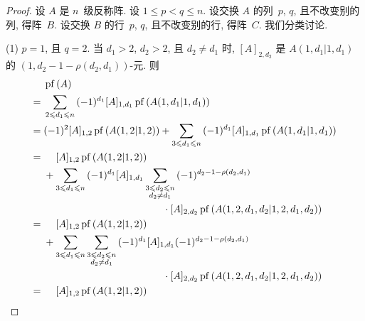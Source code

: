 \documentclass[../libro.tex]{subfiles}
\begin{document}
\begin{proof}
    设 \(A\) 是 \(n\)~级反称阵.
    设 \(1 \leq p < q \leq n\).
    设交换 \(A\) 的列~\(p\), \(q\), 且不改变别的列, 得阵~\(B\).
    设交换 \(B\) 的行~\(p\), \(q\), 且不改变别的行, 得阵~\(C\).
    我们分类讨论.

    (1)
    \(p = 1\), 且 \(q = 2\).
    当 \(d_1 > 2\), \(d_2 > 2\), 且 \(d_2 \neq d_1\) 时,
    \([A]_{2,d_2}\) 是 \(A({1,d_1}|{1,d_1})\)
    的 \((1, d_2 - 1 - \rho(d_2, d_1))\)-元.
    则
    \begin{align*}
        &
        \operatorname{pf} {(A)}
        \\
        = {} &
        \sum_{2 \leq d_1 \leq n}
        {
            (-1)^{d_1} [A]_{1,d_1}
            \operatorname{pf} {(A({1,d_1}|{1,d_1}))}
        }
        \\
        = {} &
        (-1)^{2} [A]_{1,2}
        \operatorname{pf} {(A({1,2}|{1,2}))}
        +
        \sum_{3 \leq d_1 \leq n}
        {
            (-1)^{d_1} [A]_{1,d_1}
            \operatorname{pf} {(A({1,d_1}|{1,d_1}))}
        }
        \\
        = {} &
        \hphantom{{} + {}}
        [A]_{1,2}
        \operatorname{pf} {(A({1,2}|{1,2}))}
        \\
        &
        +
        \sum_{3 \leq d_1 \leq n}
        {
            (-1)^{d_1} [A]_{1,d_1}
            \sum_{\substack{3 \leq d_2 \leq n \\ d_2 \neq d_1}}
            {
                (-1)^{d_2 - 1 - \rho(d_2, d_1)}
            }
        }
        \\
        &
        \qquad \qquad \qquad
        \qquad \qquad \qquad
        \cdot
        [A]_{2,d_2}
        \operatorname{pf} {(A({1,2,d_1,d_2}|{1,2,d_1,d_2}))}
        \\
        = {} &
        \hphantom{{} + {}}
        [A]_{1,2}
        \operatorname{pf} {(A({1,2}|{1,2}))}
        \\
        &
        +
        \sum_{3 \leq d_1 \leq n}
        {
            \sum_{\substack{3 \leq d_2 \leq n \\ d_2 \neq d_1}}
            {
                (-1)^{d_1}
                [A]_{1,d_1}
                (-1)^{d_2 - 1 - \rho(d_2, d_1)}
            }
        }
        \\
        &
        \qquad \qquad \qquad
        \qquad \qquad \qquad
        \cdot
        [A]_{2,d_2}
        \operatorname{pf} {(A({1,2,d_1,d_2}|{1,2,d_1,d_2}))}
        \\
        = {} &
        \hphantom{{} + {}}
        [A]_{1,2}
        \operatorname{pf} {(A({1,2}|{1,2}))}

\end{align*}
\end{proof}
\end{document}
